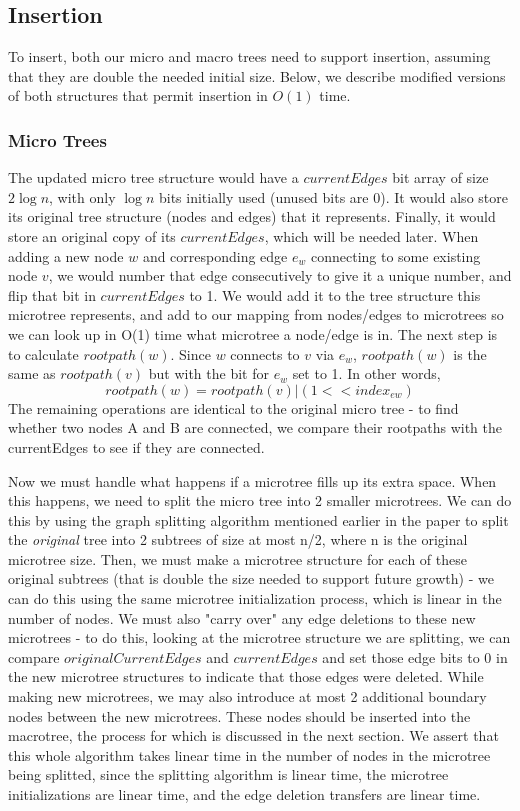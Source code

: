 \documentclass{article}
\begin{document}
\subsection{Insertion}
To insert, both our micro and macro trees need to support insertion, assuming that they are double the needed initial size.  Below, we describe modified versions of both structures that permit insertion in $O(1)$ time.
\subsubsection{Micro Trees}
The updated micro tree structure would have a $currentEdges$ bit array of size $2\log n$, with only $\log n$ bits initially used (unused bits are 0).  It would also store its original tree structure (nodes and edges) that it represents.  Finally, it would store an original copy of its $currentEdges$, which will be needed later.  When adding a new node $w$ and corresponding edge $e_w$ connecting to some existing node $v$, we would number that edge consecutively to give it a unique number, and flip that bit in $currentEdges$ to 1.  We would add it to the tree structure this microtree represents, and add to our mapping from nodes/edges to microtrees so we can look up in O(1) time what microtree a node/edge is in.  The next step is to calculate $rootpath(w)$.  Since $w$ connects to $v$ via $e_w$, $rootpath(w)$ is the same as $rootpath(v)$ but with the bit for $e_w$ set to 1.  In other words,
\begin{equation}
    rootpath(w) = rootpath(v) | (1 << index_{ew})
\end{equation}
The remaining operations are identical to the original micro tree - to find whether two nodes A and B are connected, we compare their rootpaths with the currentEdges to see if they are connected.

Now we must handle what happens if a microtree fills up its extra space.  When this happens, we need to split the micro tree into 2 smaller microtrees.  We can do this by using the graph splitting algorithm mentioned earlier in the paper to split the \textit{original} tree into 2 subtrees of size at most n/2, where n is the original microtree size.  Then, we must make a microtree structure for each of these original subtrees (that is double the size needed to support future growth) - we can do this using the same microtree initialization process, which is linear in the number of nodes.  We must also "carry over" any edge deletions to these new microtrees - to do this, looking at the microtree structure we are splitting, we can compare $originalCurrentEdges$ and $currentEdges$ and set those edge bits to 0 in the new microtree structures to indicate that those edges were deleted.  While making new microtrees, we may also introduce at most 2 additional boundary nodes between the new microtrees.  These nodes should be inserted into the macrotree, the process for which is discussed in the next section.  We assert that this whole  algorithm takes linear time in the number of nodes in the microtree being splitted, since the splitting algorithm is linear time, the microtree initializations are linear time, and the edge deletion transfers are linear time.
\end{document}
